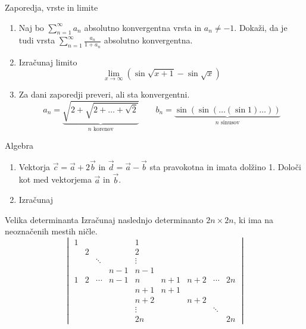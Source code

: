 \newcommand{\zz}{$\mathbb{Z}$}
\newcommand{\rr}{$\mathbb{R}$}
\newcommand{\cc}{$\mathbb{C}$}

\begin{frame}{Zaporedja, vrste in limite}
	\begin{enumerate}
		\item 
		Naj bo $\sum_{n=1}^{\infty}a_n$ absolutno konvergentna vrsta in $a_n \ne -1$.
		Dokaži, da je tudi vrsta $\sum_{n=1}^\infty \frac{a_n}{1+a_n}$
		absolutno konvergentna.

		\item
		Izračunaj limito
		\[\lim_{x\to \infty}(\sin \sqrt{x+1}-\sin \sqrt{x})\]

		\item
		Za dani zaporedji preveri, ali sta konvergentni.
		\[a_n = \underbrace{\sqrt{2+\sqrt{2+\dots+\sqrt{2}}}}_\text{$n$ korenov} \qquad b_n = \underbrace{\sin(\sin(\dots(\sin 1)\dots))}_\text{$n$ sinusov}\]
	\end{enumerate}
\end{frame}

\begin{frame}{Algebra}
	\begin{enumerate}
		\item
		Vektorja $\vec{c}=\vec{a} + 2\vec{b}$ in $\vec{d} = \vec{a} - \vec{b}$
		sta pravokotna in imata dolžino 1. Določi kot med vektorjema $\vec{a}$ in $\vec{b}$.
		\item 
		Izračunaj
	\end{enumerate}
\end{frame}

\begin{frame}{Velika determinanta}
	Izračunaj naslednjo determinanto $2n \times 2n$, ki ima na neoznačenih mestih ničle.
	$$
		\begin{vmatrix}
			1 &&&& 1 &&&& \\
			& 2 &&& 2 &&&& \\
			&& \ddots && \vdots &&&& \\
			&&& n-1 & n-1 &&&& \\
			1 & 2 & \cdots & n-1 & n & n+1 & n+2 & \cdots & 2n \\
			&&&& n+1 & n+1 &&& \\
			&&&& n+2 && n+2 && \\
			&&&& \vdots &&& \ddots & \\
			&&&& 2n &&&& 2n
		\end{vmatrix}
	$$
\end{frame}

